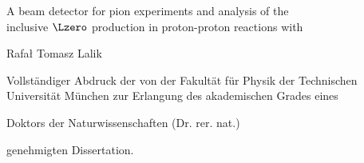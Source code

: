 {%
  \centering %
  \vspace*{\baselineskip} %
  
  
  {{A beam detector for pion experiments and analysis of the} \\[0.3\baselineskip] %
	{inclusive $\Lzero$ production in proton-proton reactions with \hades} \\[1.5\baselineskip]
  }
  
  
  \scshape %
  
  {Rafał Tomasz Lalik }
  
  \vspace*{2\baselineskip} %

	Vollständiger Abdruck der von der Fakultät für Physik der Technischen
	Universität München zur Erlangung des akademischen Grades eines

	\vspace*{2ex}
	Doktors der Naturwissenschaften (Dr. rer. nat.)
	\vspace*{2ex}

	genehmigten Dissertation.

  \vspace*{\fill}

% 
% 
% 

}
